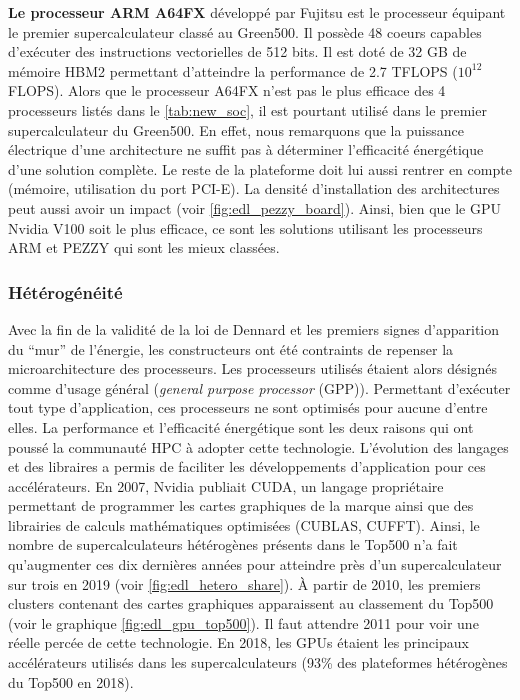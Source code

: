         \textbf{Le processeur ARM A64FX} développé par Fujitsu est le processeur équipant le premier supercalculateur classé au Green500. Il possède 48 coeurs capables d'exécuter des instructions vectorielles de 512 bits. Il est doté de 32 GB de mémoire HBM2 permettant d'atteindre la performance de 2.7 TFLOPS ($10^{12}$ \gls{FLOPS}). Alors que le processeur A64FX n'est pas le plus efficace des 4 processeurs listés dans le \autoref{tab:new_soc}, il est pourtant utilisé dans le premier supercalculateur du Green500. En effet, nous remarquons que la puissance électrique d'une architecture ne suffit pas à déterminer l'efficacité énergétique d'une solution complète. Le reste de la plateforme doit lui aussi rentrer en compte (mémoire, utilisation du port PCI-E). La densité d'installation des architectures peut aussi avoir un impact (voir \autoref{fig:edl_pezzy_board}). Ainsi, bien que le GPU Nvidia V100 soit le plus efficace, ce sont les solutions utilisant les processeurs ARM et PEZZY qui sont les mieux classées.
        
    \subsubsection{Hétérogénéité} \label{sec:edl_hpc_hetero}
        
        Avec la fin de la validité de la loi de Dennard et les premiers signes d'apparition du ``mur'' de l'énergie, les constructeurs ont été contraints de repenser la microarchitecture des processeurs. Les processeurs utilisés étaient alors désignés comme d'usage général (\textit{general purpose processor} (GPP)). Permettant d'exécuter tout type d'application, ces processeurs ne sont optimisés pour aucune d'entre elles. 
        La performance et l'efficacité énergétique sont les deux raisons qui ont poussé la communauté HPC à adopter cette technologie. L'évolution des langages et des libraires a permis de faciliter les développements d'application pour ces accélérateurs. En 2007, Nvidia publiait CUDA, un langage propriétaire permettant de programmer les cartes graphiques de la marque ainsi que des librairies de calculs mathématiques optimisées (CUBLAS, CUFFT). Ainsi, le nombre de supercalculateurs hétérogènes présents dans le Top500 n'a fait qu'augmenter ces dix dernières années pour atteindre près d'un supercalculateur sur trois en 2019 (voir \autoref{fig:edl_hetero_share}). À partir de 2010, les premiers clusters contenant des cartes graphiques apparaissent au classement du Top500 (voir le graphique \ref{fig:edl_gpu_top500}). Il faut attendre 2011 pour voir une réelle percée de cette technologie. En 2018, les GPUs étaient les principaux accélérateurs utilisés dans les supercalculateurs (93\% des plateformes hétérogènes du Top500 en 2018). 
        
